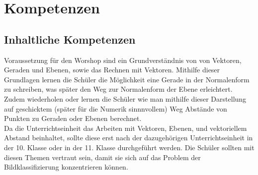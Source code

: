     \section{Kompetenzen}
        \subsection{Inhaltliche Kompetenzen}
            Voraussetzung für den Worshop sind ein Grundverständnis von von Vektoren, Geraden und Ebenen, sowie das Rechnen mit Vektoren.
            Mithilfe dieser Grundlagen lernen die Schüler die Möglichkeit eine Gerade in der Normalenform zu schreiben, was später den Weg zur Normalenform der Ebene erleichtert.
            Zudem wiederholen oder lernen die Schüler wie man mithilfe dieser Darstellung auf geschicktem (später für die Numerik sinnnvollem) Weg Abstände von Punkten zu Geraden oder Ebenen berechnet.  \\

            Da die Unterrichtseinheit das Arbeiten mit Vektoren, Ebenen, und vektoriellem Abstand beinhaltet, sollte diese erst nach der dazugehörigen Unterrichtseinheit in der 10. Klasse oder in der 11. Klasse durchgeführt werden. Die Schüler sollten mit diesen Themen vertraut sein, damit sie sich auf das Problem der Bildklassifizierung konzentrieren können.
